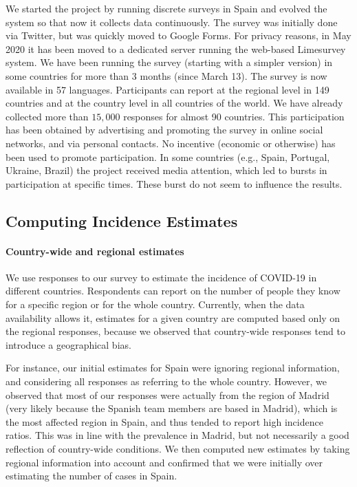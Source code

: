 \documentclass{article}
\newcommand{\af}[1]{{#1}}
\begin{document}
We started the project by running discrete surveys in Spain and evolved the system so that now it collects data continuously.
\af{The survey was initially done via Twitter, but was quickly moved to Google Forms. For privacy reasons, in May 2020 it has been moved to a
dedicated server running the web-based Limesurvey system.}
We have been running the survey (starting with a simpler version) in some countries for more than 3 months (since March 13). The survey is now available in 57 languages. Participants can report at the regional level in 149 countries and at the country level in all countries of the world. We have already collected more than $15,000$ responses for almost 90 countries. \af{This participation has been obtained by advertising and promoting
the survey in online social networks, and via personal contacts. No incentive (economic or otherwise) has been used to promote participation. In some countries (e.g., Spain, Portugal, Ukraine, Brazil) the project received media attention, which led to bursts in participation at specific times. These burst do not seem to influence the results.}

\subsection{Computing Incidence Estimates}

\paragraph{Country-wide and regional estimates} 
We use responses to our survey to estimate the incidence of COVID-19 in different countries. Respondents can report on the number of people they know for a specific region or for the whole country. 
Currently, when the data availability allows it,  estimates for a given country are computed based only on the regional responses, because \af{we observed that} country-wide responses tend to introduce a geographical bias. 

For instance, our initial estimates for Spain were ignoring regional information, and considering all responses as referring to the whole country. However, we observed that most of our responses were actually from the region of Madrid \af{(very likely because the Spanish team members are based in Madrid)}, which is the most affected region in Spain, and thus tended to report high incidence ratios. This was in line with the prevalence in Madrid, but not necessarily a good reflection of country-wide conditions. We then computed new estimates by taking regional information into account and confirmed that we were initially over estimating the number of cases in Spain. 
\end{document}
